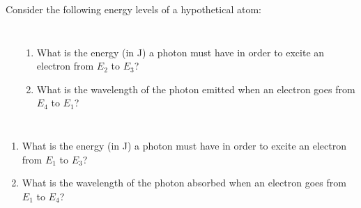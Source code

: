 \documentclass[notes=onlyslideswithnotes,notes=hide]{beamer}
\begin{document}
\begin{inclass}
	Consider the following energy levels of a hypothetical atom:

	\begin{columns}
		\begin{center}
		\end{center}
		\begin{enumerate}
			\item What is the energy (in \si{\joule}) a photon must
				have in order to excite an electron from $E_2$
				to $E_3$?
			\item What is the wavelength of the photon emitted when
				an electron goes from $E_4$ to $E_1$?
		\end{enumerate}
	\end{columns}
\end{inclass}

\begin{onyourown}%
	\begin{enumerate}
		\item What is the energy (in \si{\joule}) a photon must
			have in order to excite an electron from $E_1$
			to $E_3$?
		\item What is the wavelength of the photon \alert{absorbed} when
			an electron goes from $E_1$ to $E_4$?
	\end{enumerate}
\end{onyourown}
\end{document}
